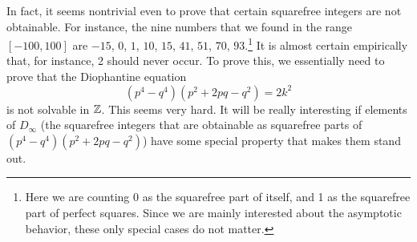 In fact, it seems nontrivial even to prove that certain squarefree
integers are not obtainable. For instance, the nine numbers that we
found in the range $[-100, 100]$ are $-15$, $0$, $1$, $10$, $15$,
$41$, $51$, $70$, $93$.\footnote{%
  Here we are counting 0 as the squarefree part of itself, and 1 as
  the squarefree part of perfect squares. Since we are mainly
  interested about the asymptotic behavior, these only special cases
  do not matter.}
It is almost certain empirically that, for instance, 2 should never
occur. To prove this, we essentially need to prove that the
Diophantine equation
\[
(p^4 - q^4)(p^2 + 2pq - q^2) = 2 k^2
\]
is not solvable in $\mathbb{Z}$. This seems very hard. It will be really
interesting if elements of $D_\infty$ (the squarefree integers that
are obtainable as squarefree parts of $(p^4 - q^4)(p^2 + 2pq - q^2)$)
have some special property that makes them stand out.

